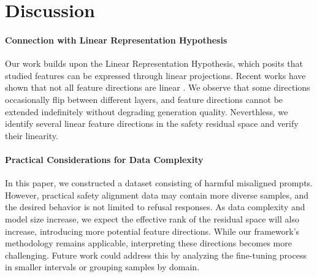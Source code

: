 \section{Discussion}

\paragraph{Connection with Linear Representation Hypothesis}
Our work builds upon the Linear Representation Hypothesis, which posits that studied features can be expressed through linear projections. Recent works have shown that not all feature directions are linear \cite{engels2024not}. We observe that some directions occasionally flip between different layers, and feature directions cannot be extended indefinitely without degrading generation quality. Neverthless, we identify several linear feature directions in the safety residual space and verify their linearity.

\paragraph{Practical Considerations for Data Complexity}
In this paper, we constructed a dataset consisting of harmful misaligned prompts. However, practical safety alignment data may contain more diverse samples, and the desired behavior is not limited to refusal responses. As data complexity and model size increase, we expect the effective rank of the residual space will also increase, introducing more potential feature directions. While our framework's methodology remains applicable, interpreting these directions becomes more challenging. Future work could address this by analyzing the fine-tuning process in smaller intervals or grouping samples by domain.
